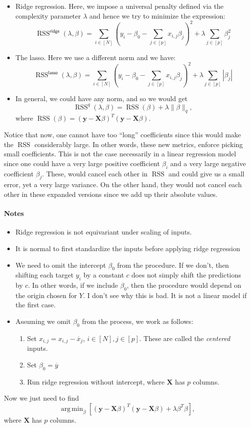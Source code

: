 \documentclass[11pt]{article}
\theoremstyle{definition}
\newcommand{\XX}{\mathbf{X}}
\newcommand{\yy}{\mathbf{y}}
\newcommand{\ridge}{\textsf{ridge}}
\newcommand{\lasso}{\textsf{lasso}}
\DeclareMathOperator*{\argmin}{arg\,min} \DeclareMathOperator*{\Cov}{Cov}
\DeclareMathOperator*{\RSS}{RSS} \DeclareMathOperator*{\WRSS}{WRSS}
\begin{document}
\begin{itemize}
	\item Ridge regression. Here, we impose a universal penalty defined via
	      the complexity parameter $\lambda$ and hence we try to minimize the expression:
	      \[\RSS^\ridge(\lambda,\beta)=\sum_{i\in[N]}\left(y_i-\beta_0-\sum_{j\in[p]}x_{i,j}\beta_j\right)^2
		      + \lambda\sum_{j\in[p]}\beta_j^2\]

	\item The lasso. Here we use a different norm and we have:
	      \[\RSS^\lasso(\lambda,\beta)=\sum_{i\in[N]}\left(y_i-\beta_0-\sum_{j\in[p]}x_{i,j}\beta_j\right)^2
		      + \lambda\sum_{j\in[p]}|\beta_j|\]

	\item In general, we could have any norm, and so we would get
	      \[\RSS^q(\lambda,\beta)=\RSS(\beta) + \lambda \|\beta\|_q,\] where
	      $\RSS(\beta)=(\yy-\XX\beta)^T(\yy-\XX\beta)$.
\end{itemize}
Notice that now, one cannot have too ``long'' coefficients since this would make
the $\RSS$ considerably large. In other words, these new metrics, enforce
picking small coefficients. This is not the case necessarily in a linear
regression model since one could have a very large positive coefficient
$\beta_i$ and a very large negative coefficient $\beta_j$. These, would cancel
each other in $\RSS$ and could give us a small error, yet a very large variance.
On the other hand, they would not cancel each other in these expanded versions
since we add up their absolute values.

\paragraph{Notes}
\begin{itemize}
	\item Ridge regression is not equivariant under scaling of inputs.
	\item It is normal to first standardize the inputs before applying ridge
	      regression
	\item We need to omit the intercept $\beta_0$ from the procedure. If we
	      don't, then shifting each target $y_i$ by a constant $c$ does not simply
	      shift the predictions by $c$. In other words, if we include $\beta_0$, then
	      the procedure would depend on the origin chosen for $Y$. I don't see why
	      this is bad. It is not a linear model if the first case.
	\item Assuming we omit $\beta_0$ from the process, we work as follows:
	      \begin{enumerate}
		      \item Set $x_{i,j}=x_{i,j}-\overline x_j$, $i\in[N],j\in[p]$. These are
		            called the \emph{centered} inputs.
		      \item Set $\beta_0=\overline y$
		      \item Run ridge regression without intercept, where $\XX$ has $p$
		            columns.
	      \end{enumerate}
\end{itemize}
Now we just need to find
\[\argmin_\beta \left[(\yy-\XX\beta)^T(\yy-\XX\beta) + \lambda\beta^T\beta\right],\]
where $\XX$ has $p$ columns.
\end{document}
